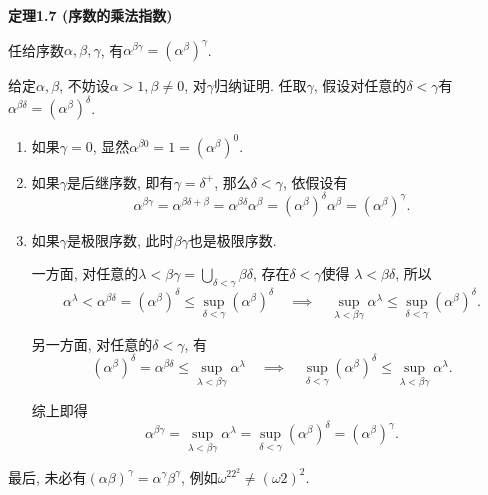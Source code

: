\documentclass[UTF8]{ctexart}
\begin{document}
\hypertarget{sec:定理1.7}{}
\noindent\textbf{定理1.7 (序数的乘法指数)}

任给序数$\alpha,\beta,\gamma$, 有$\alpha^{\beta\gamma}=(\alpha^\beta)^\gamma$.


给定$\alpha,\beta$, 不妨设$\alpha>1,\beta\neq 0$, 对$\gamma$归纳证明.
任取$\gamma$, 假设对任意的$\delta<\gamma$有
$\alpha^{\beta\delta}=(\alpha^\beta)^\delta$.

\begin{enumerate}
    \item 如果$\gamma=0$, 显然$\alpha^{\beta0}=1=(\alpha^\beta)^0$.
    
    \vspace{3pt}
    \item 如果$\gamma$是后继序数, 即有$\gamma=\delta^+$, 那么$\delta<\gamma$,
    依假设有
    \[
        \alpha^{\beta\gamma}=\alpha^{\beta\delta+\beta}=
        \alpha^{\beta\delta}\alpha^\beta=(\alpha^\beta)^\delta\alpha^\beta=
        (\alpha^\beta)^\gamma.
    \]

    \vspace{3pt}
    \item 如果$\gamma$是极限序数, 此时$\beta\gamma$也是极限序数.
    
    \vspace{3pt}\hspace{2.17em}
    一方面, 对任意的$\displaystyle\lambda<\beta\gamma=
    \bigcup_{\delta<\gamma}\beta\delta$, 存在$\delta<\gamma$使得
    $\lambda<\beta\delta$, 所以
    \vspace{3pt}
    \[
        \alpha^\lambda<\alpha^{\beta\delta}=(\alpha^\beta)^\delta
        \leqslant\sup_{\delta<\gamma}(\alpha^\beta)^\delta
        \quad\implies\quad\sup_{\lambda<\beta\gamma}\alpha^\lambda
        \leqslant\sup_{\delta<\gamma}(\alpha^\beta)^\delta.
    \]

    \vspace{3pt}\hspace{2.17em}
    另一方面, 对任意的$\delta<\gamma$, 有
    \vspace{3pt}
    \[
        (\alpha^\beta)^\delta=\alpha^{\beta\delta}
        \leqslant\sup_{\lambda<\beta\gamma}\alpha^\lambda
        \quad\implies\quad\sup_{\delta<\gamma}(\alpha^\beta)^\delta
        \leqslant\sup_{\lambda<\beta\gamma}\alpha^\lambda.
    \]

    \hspace{2.17em}
    综上即得
    \begin{equation*}
        \alpha^{\beta\gamma}=\sup_{\lambda<\beta\gamma}\alpha^\lambda=
        \sup_{\delta<\gamma}(\alpha^\beta)^\delta=(\alpha^\beta)^\gamma.
    \tag*{\qedsymbol}\end{equation*}
\end{enumerate}

\vspace{15pt}

最后, 未必有$(\alpha\beta)^\gamma=\alpha^\gamma\beta^\gamma$,
例如$\omega^22^2\neq(\omega2)^2$.
\end{document}
